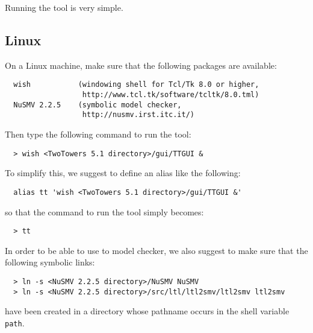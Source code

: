 Running the tool is very simple.


\subsection{Linux}

On a Linux machine, make sure that the following packages are available:

	\begin{verbatim}
  wish           (windowing shell for Tcl/Tk 8.0 or higher,
                  http://www.tcl.tk/software/tcltk/8.0.tml)
  NuSMV 2.2.5    (symbolic model checker,
                  http://nusmv.irst.itc.it/)
	\end{verbatim}

\noindent
Then type the following command to run the tool:

	\begin{verbatim}
  > wish <TwoTowers 5.1 directory>/gui/TTGUI &
	\end{verbatim}

\noindent
To simplify this, we suggest to define an alias like the following:

	\begin{verbatim}
  alias tt 'wish <TwoTowers 5.1 directory>/gui/TTGUI &'
	\end{verbatim}

\noindent
so that the command to run the tool simply becomes:

	\begin{verbatim}
  > tt
	\end{verbatim}

\noindent
In order to be able to use to model checker, we also suggest to make sure that the following symbolic links:

	\begin{verbatim}
  > ln -s <NuSMV 2.2.5 directory>/NuSMV NuSMV
  > ln -s <NuSMV 2.2.5 directory>/src/ltl/ltl2smv/ltl2smv ltl2smv
	\end{verbatim}

\noindent
have been created in a directory whose pathname occurs in the shell variable {\tt path}.


